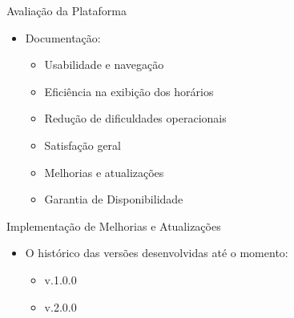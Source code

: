 \begin{frame}{Avaliação da Plataforma}
    \begin{itemize}
        \item Documentação: \vspace{0.5cm}
              \begin{itemize}
                  \item Usabilidade e navegação \vspace{0.5cm}
                  \item Eficiência na exibição dos horários \vspace{0.5cm}
                  \item Redução de dificuldades operacionais \vspace{0.5cm}
                  \item Satisfação geral \vspace{0.5cm}
                  \item Melhorias e atualizações \vspace{0.5cm}
                  \item Garantia de Disponibilidade \vspace{0.5cm}
              \end{itemize}
    \end{itemize}
\end{frame}

\begin{frame}{Implementação de Melhorias e Atualizações}
    \begin{itemize}
        \item O histórico das versões desenvolvidas até o momento: \vspace{0.5cm}
              \begin{itemize}
                  \item v.1.0.0 \vspace{0.5cm}
                  \item v.2.0.0 \vspace{0.5cm}
              \end{itemize}
    \end{itemize}
\end{frame}

